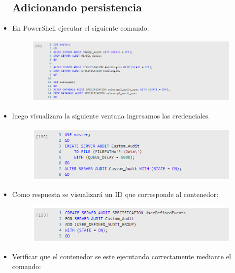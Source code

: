\begin{itemize}
\subsection{ Adicionando persistencia}
	\item En PowerShell ejecutar el siguiente comando.
                     \begin{figure}[H]
		\begin{center}
		\includegraphics[width=15cm]{./Imagenes/s19}
		\end{center}
		\end{figure}   
          \item luego visualizara la siguiente ventana  ingresamos las credenciales.
                     \begin{figure}[H]
		\begin{center}
		\includegraphics[width=15cm]{./Imagenes/s20}
		\end{center}
		\end{figure}   
	\item Como respuesta se visualizará un ID que corresponde al contenedor:
                     \begin{figure}[H]
		\begin{center}
		\includegraphics[width=15cm]{./Imagenes/s21}
		\end{center}
		\end{figure}   
	\item Verificar que el contenedor se este ejecutando correctamente mediante el comando:

\end{itemize}
